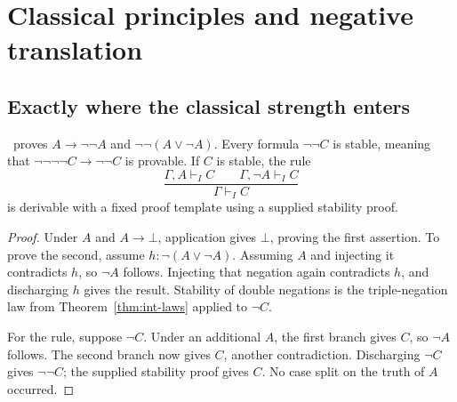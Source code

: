 \section{Classical principles and negative translation}\label{sec:negative}

\subsection{Exactly where the classical strength enters}

\begin{lemma}\label{thm:stable-case}
\IPC\ proves $A\to\neg\neg A$ and $\neg\neg(A\vee\neg A)$.
Every formula $\neg\neg C$ is stable, meaning that
$\neg\neg\neg\neg C\to\neg\neg C$ is provable.
If $C$ is stable, the rule
\[
 \frac{\Gamma,A\vdash_I C\qquad\Gamma,\neg A\vdash_I C}
      {\Gamma\vdash_I C}
\]
is derivable with a fixed proof template using a supplied stability proof.
\end{lemma}
\begin{proof}
Under $A$ and $A\to\bot$, application gives $\bot$, proving the first
assertion. To prove the second, assume $h:\neg(A\vee\neg A)$. Assuming
$A$ and injecting it contradicts $h$, so $\neg A$ follows. Injecting that
negation again contradicts $h$, and discharging $h$ gives the result.
Stability of double negations is the triple-negation law from
Theorem~\ref{thm:int-laws} applied to $\neg C$.

For the rule, suppose $\neg C$. Under an additional $A$, the first branch
gives $C$, so $\neg A$ follows. The second branch now gives $C$, another
contradiction. Discharging $\neg C$ gives $\neg\neg C$; the supplied
stability proof gives $C$. No case split on the truth of $A$ occurred.
\end{proof}

